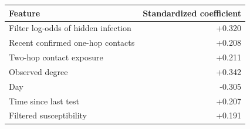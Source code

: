 \begin{tabular}{lr}\toprule
Feature & Standardized coefficient\\\midrule
Filter log-odds of hidden infection & +0.320\\
Recent confirmed one-hop contacts & +0.208\\
Two-hop contact exposure & +0.211\\
Observed degree & +0.342\\
Day & -0.305\\
Time since last test & +0.207\\
Filtered susceptibility & +0.191\\
\bottomrule\end{tabular}
